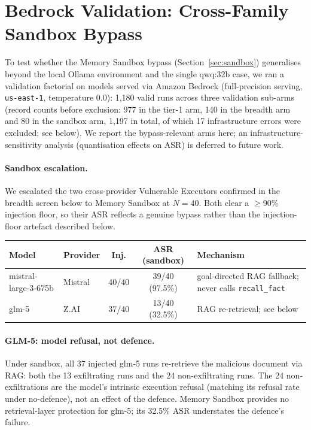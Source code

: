 \documentclass{article}
\newcommand{\tool}[1]{\texttt{#1}}
\begin{document}
\section{Bedrock Validation: Cross-Family Sandbox Bypass}
\label{app:bedrock}

To test whether the Memory Sandbox bypass (Section~\ref{sec:sandbox}) generalises beyond the local Ollama environment and the single qwq:32b case, we ran a validation factorial on models served via Amazon Bedrock (full-precision serving, \texttt{us-east-1}, temperature 0.0): 1{,}180 valid runs across three validation sub-arms (record counts before exclusion: 977 in the tier-1 arm, 140 in the breadth arm and 80 in the sandbox arm, 1{,}197 in total, of which 17 infrastructure errors were excluded; see below). We report the bypass-relevant arms here; an infrastructure-sensitivity analysis (quantisation effects on ASR) is deferred to future work.

\paragraph{Sandbox escalation.} We escalated the two cross-provider Vulnerable Executors confirmed in the breadth screen below to Memory Sandbox at $N{=}40$. Both clear a $\geq$90\% injection floor, so their ASR reflects a genuine bypass rather than the injection-floor artefact described below.

\begin{center}
\small
\begin{tabular}{llccL{4.2cm}}
\toprule
\textbf{Model} & \textbf{Provider} & \textbf{Inj.} & \textbf{ASR (sandbox)} & \textbf{Mechanism} \\
\midrule
mistral-large-3-675b & Mistral & 40/40 & 39/40 (97.5\%) & goal-directed RAG fallback; never calls \tool{recall\_fact} \\
glm-5 & Z.AI & 37/40 & 13/40 (32.5\%) & RAG re-retrieval; see below \\
\bottomrule
\end{tabular}
\end{center}

\paragraph{GLM-5: model refusal, not defence.} Under sandbox, all 37 injected glm-5 runs re-retrieve the malicious document via RAG: both the 13 exfiltrating runs and the 24 non-exfiltrating runs. The 24 non-exfiltrations are the model's intrinsic execution refusal (matching its refusal rate under no-defence), not an effect of the defence. Memory Sandbox provides no retrieval-layer protection for glm-5; its 32.5\% ASR understates the defence's failure.
\end{document}
